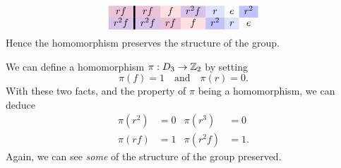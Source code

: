 \documentclass{ximera}
\begin{document}
\begin{example}
\[\begin{array}{c!{\vline width 2pt}cccccc}
      r f \cellcolor{blue!33!red!24!white}        & rf \cellcolor{blue!33!red!24!white}   & f \cellcolor{red!12!white} & r^2f \cellcolor{blue!66!red!24!white}    & r\cellcolor{blue!12!white}   & e     & r^2\cellcolor{blue!24!white}    \\  
      r^2 f\cellcolor{blue!66!red!24!white}      & r^2 f\cellcolor{blue!66!red!24!white} & rf \cellcolor{blue!33!red!24!white}    & f \cellcolor{red!12!white}   & r^2\cellcolor{blue!24!white}    & r\cellcolor{blue!12!white}   & e     \\  
    \end{array}
    \]
    Hence the homomorphism preserves the structure of the group.
\end{example}


\begin{example}\label{EG:D3-Z2}
  We can define a homomorphism $\pi:D_3\to \mathbb Z_2$ by setting
  \[
  \pi(f) = 1\quad\text{and}\quad\pi(r) = 0. 
  \]
  With these two facts, and the property of $\pi$ being a
  homomorphism, we can deduce
  \begin{align*}
    \pi(r^2) &= 0 &  \pi(r^3) &= 0 \\
    \pi(rf)  &=1 & \pi(r^2f) &= 1.
  \end{align*}
 Again, we can see \textit{some} of the structure of the group preserved.
\end{example}
\end{document}
